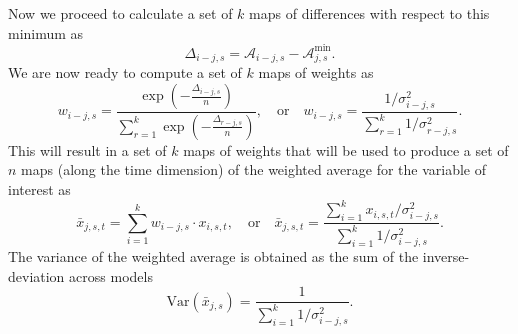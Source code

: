 \documentclass[gmd, manuscript]{copernicus}
\begin{document}
Now we proceed to calculate a set of $k$ maps of differences with respect to this minimum as
\begin{equation}
\Delta_{i-j, s} = \mathcal{A}_{i-j, s} - \mathcal{A}_{j, s}^{\min}.
\end{equation}
We are now ready to compute a set of $k$ maps of weights as
\begin{equation}
w_{i-j, s} = \frac{\exp (- \frac{\Delta_{i-j, s}}{n})}{\sum_{r=1}^k \exp (- \frac{\Delta_{r-j, s}}{n}) },
\quad \mathrm{or} \quad 
w_{i-j, s} = \frac{1/\sigma^2_{i-j,s}}{\sum^k_{r=1} 1/\sigma^2_{r-j, s}}.
\end{equation}
This will result in a set of $k$ maps of weights that will be used to produce a set of $n$ maps (along the time dimension) of the weighted average for the variable of interest as
\begin{equation}
\bar{x}_{j, s, t} = \sum_{i=1}^{k} w_{i-j, s} \cdot x_{i, s, t},
\quad \mathrm{or} \quad
\bar{x}_{j, s, t} = \frac{\sum_{i=1}^k  x_{i, s, t} /{\sigma^2_{i-j, s}}}{\sum_{i=1}^k 1/\sigma^2_{i-j, s}}.
\end{equation}
The variance of the weighted average is obtained as the sum of the inverse-deviation across models
\begin{equation}\label{eq:avevar}
\mathrm{Var}(\bar{x}_{j,s}) = \frac{1}{\sum_{i=1}^k 1/\sigma^2_{i-j, s}}.
\end{equation}


\end{document}
